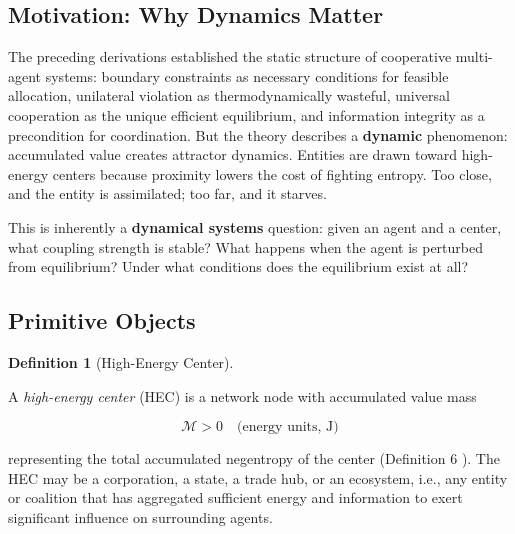 \documentclass[11pt]{article}
\theoremstyle{plain}
\theoremstyle{definition}
\newtheorem{definition}{Definition}
\theoremstyle{remark}
\let\origsubsection\subsection
\renewcommand{\subsection}{\needspace{7\baselineskip}\origsubsection}
\begin{document}
\subsection{Motivation: Why Dynamics
Matter}\label{motivation-why-dynamics-matter}

The preceding derivations \citep{TC-I, TC-II, TC-III, TC-IV, TC-V}
established the static structure of cooperative multi-agent systems:
boundary constraints as necessary conditions for feasible allocation,
unilateral violation as thermodynamically wasteful, universal
cooperation as the unique efficient equilibrium, and information
integrity as a precondition for coordination. But the theory describes a
\textbf{dynamic} phenomenon: accumulated value creates attractor
dynamics. Entities are drawn toward high-energy centers because
proximity lowers the cost of fighting entropy. Too close, and the entity
is assimilated; too far, and it starves.

This is inherently a \textbf{dynamical systems} question: given an agent
and a center, what coupling strength is stable? What happens when the
agent is perturbed from equilibrium? Under what conditions does the
equilibrium exist at all?

\subsection{Primitive Objects}\label{primitive-objects}

\begin{definition}[High-Energy Center]
\label{def-high-energy-center}

A \emph{high-energy center} (HEC) is a network node with accumulated value mass

$$\mathcal{M} > 0 \quad \text{(energy units, J)}$$

representing the total accumulated negentropy of the center (Definition 6 \citep{TC-III}). The HEC may be a corporation, a state, a trade hub, or an ecosystem, i.e., any entity or coalition that has aggregated sufficient energy and information to exert significant influence on surrounding agents.
\end{definition}
\end{document}
